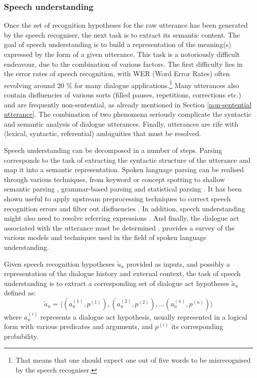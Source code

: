 \subsubsection*{Speech understanding}
\label{section:speechunderstanding}

Once the set of recognition hypotheses for the raw utterance has been generated by the speech recogniser, the next task is to extract its semantic content.  The goal of speech understanding is to build a representation of the meaning(s) expressed by the form of a given utterance.  This task is a notoriously difficult endeavour, due to the combination of various factors. The first difficulty lies in the error rates of speech recognition, with WER (Word Error Rates) often revolving around 20 \% for many dialogue applications.\footnote{That means that one should expect one out of five words to be misrecognised by the speech recogniser.}  Many utterances also contain disfluencies of various sorts (filled pauses, repetitions, corrections etc.) and are frequently non-sentential, as already mentioned in Section \ref{non-sentential utterance}.  The combination of two phenomena seriously complicate the syntactic and semantic analysis of dialogue utterances. Finally, utterances are rife with (lexical, syntactic, referential) ambiguities that must be resolved. 

Speech understanding can be decomposed in a number of steps.  Parsing corresponds to the task of extracting the syntactic structure of the utterance and map it into a semantic representation.  Spoken language parsing can be realised through various techniques, from keyword or concept spotting \citep{ZhangZY07,KomataniTKK01} to shallow semantic parsing \citep{Coppola:2009}, grammar-based parsing \citep{VanNoord1999} and statistical parsing \citep{He200585}.  It has been shown useful to apply upstream preprocessing techniques to correct speech recognition errors \citep{Ringger:1996} and filter out disfluencies \citep{Johnson:2004}. In addition, speech understanding might also need to resolve referring expressions \citep{Funakoshi:2012}.  And finally, the dialogue act associated with the utterance must be determined \citep{stolcke2000,Keizer2007}. \cite{demori2008} provides a survey of the various models and techniques used in the field of spoken language understanding. 

Given speech recognition hypotheses $\tilde{u}_u$ provided as inputs, and possibly a representation of the dialogue history and external context, the task of speech understanding is to extract a corresponding set of dialogue act hypotheses $\tilde{a}_u$ defined as: \begin{equation*}
\tilde{a}_u = \langle (a_u^{(1)}, p^{(1)}), (a_u^{(2)}, p^{(2)}), ... (a_u^{(n)}, p^{(n)})\rangle
\end{equation*}
where $a_u^{(i)}$ represents a dialogue act hypothesis, usually represented in a logical form with various predicates and arguments, and $p^{(i)}$ its corresponding probability.

